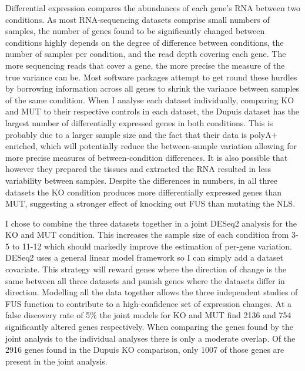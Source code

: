 Differential expression compares the abundances of each gene's RNA between two conditions. As most RNA-sequencing datasets comprise small numbers of samples, the number of genes found to be significantly changed between conditions highly depends on the degree of difference between conditions, the number of samples per condition, and the read depth covering each gene. The more sequencing reads that cover a gene, the more precise the measure of the true variance can be.
Most software packages attempt to get round these hurdles by borrowing information across all genes to shrink the variance between samples of the same condition. 
When I analyse each dataset individually, comparing KO and MUT to their respective controls in each dataset, the Dupuis dataset has the largest number of differentially expressed genes in both conditions. 
This is probably due to a larger sample size and the fact that their data is polyA+ enriched, which will potentially reduce the between-sample variation allowing for more precise measures of between-condition differences. 
It is also possible that however they prepared the tissues and extracted the RNA resulted in less variability between samples.
Despite the differences in numbers, in all three datasets the KO condition produces more differentially expressed genes than MUT, suggesting a stronger effect of knocking out FUS than mutating the NLS.



I chose to combine the three datasets together in a joint DESeq2 analysis for the KO and MUT condition. This increases the sample size of each condition from 3-5 to 11-12 which should markedly improve the estimation of per-gene variation. DESeq2 uses a general linear model framework so I can simply add a dataset covariate. 
This strategy will reward genes where the direction of change is the same between all three datasets and punish genes where the datasets differ in direction.
Modelling all the data together allows the three independent studies of FUS function to contribute to a high-confidence set of expression changes. At a false discovery rate of 5\% the joint models for KO and MUT find 2136 and 754 significantly altered genes respectively. 
When comparing the genes found by the joint analysis to the individual analyses there is only a moderate overlap. Of the 2916 genes found in the Dupuis KO comparison, only 1007 of those genes are present in the joint analysis. 

